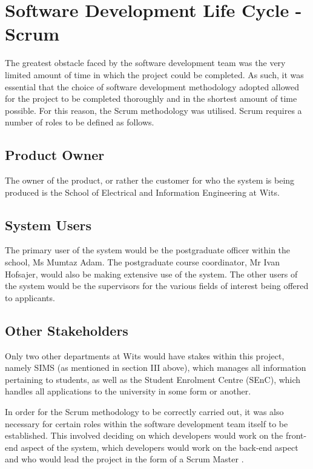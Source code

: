 \documentclass[journal]{IEEEtran}
\begin{document}

\section{Software Development Life Cycle - Scrum}

The greatest obstacle faced by the software development team was the very limited amount of time in which the project could be completed. As such, it was essential that the choice of software development methodology adopted allowed for the project to be completed thoroughly and in the shortest amount of time possible. For this reason, the Scrum methodology was utilised. Scrum requires a number of roles to be defined as follows.

\subsection{Product Owner}

The owner of the product, or rather the customer for who the system is being produced is the School of Electrical and Information Engineering at Wits.

\subsection{System Users}

The primary user of the system would be the postgraduate officer within the school, Ms Mumtaz Adam. The postgraduate course coordinator, Mr Ivan Hofsajer, would also be making extensive use of the system. The other users of the system would be the supervisors for the various fields of interest being offered to applicants.

\subsection{Other Stakeholders}

Only two other departments at Wits would have stakes within this project, namely SIMS (as mentioned in section III above), which manages all information pertaining to students, as well as the Student Enrolment Centre (SEnC), which handles all applications to the university in some form or another.

\hfill \break In order for the Scrum methodology to be correctly carried out, it was also necessary for certain roles within the software development team itself to be established. This involved deciding on which developers would work on the front-end aspect of the system, which developers would work on the back-end aspect and who would lead the project in the form of a Scrum Master \cite{ProfOtoo}.
\end{document}
